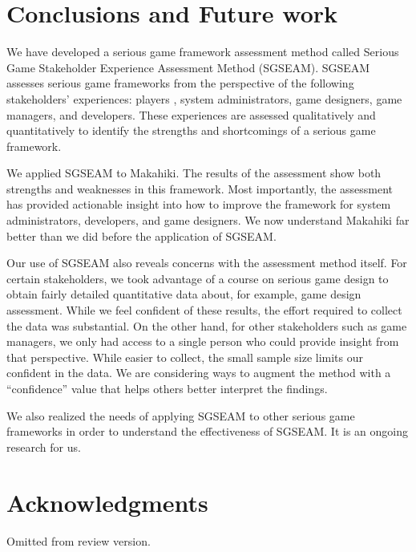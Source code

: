 \documentclass{sigchi}
\begin{document}
\section{Conclusions and Future work}

We have developed a serious game framework assessment method called Serious Game
Stakeholder Experience Assessment Method (SGSEAM). SGSEAM assesses serious game
frameworks from the perspective of the following stakeholders' experiences: players
, system administrators, game designers, game managers, and developers. These experiences 
are assessed qualitatively and quantitatively to identify the strengths and
 shortcomings of a serious game framework.

We applied SGSEAM to Makahiki. The results of the assessment show both strengths and
weaknesses in this framework.  Most importantly, the assessment has provided actionable
insight into how to improve the framework for system administrators, developers, and game
designers.  We now understand Makahiki far better than we did before the application of
SGSEAM.

Our use of SGSEAM also reveals concerns with the assessment method itself.  For certain
stakeholders, we took advantage of a course on serious game design to obtain fairly
detailed quantitative data about, for example, game design assessment.  While we feel
confident of these results, the effort required to collect the data was substantial.  On
the other hand, for other stakeholders such as game managers, we only had access to a
single person who could provide insight from that perspective.  While easier to collect,
the small sample size limits our confident in the data.  We are considering ways to
augment the method with a ``confidence'' value that helps others better interpret the
findings.  

We also realized the needs of applying SGSEAM to other serious game frameworks in order to
understand the effectiveness of SGSEAM.  It is an ongoing research for us.

\section{Acknowledgments}
Omitted from review version.


%
%
%
%
%
\balance



\end{document}
